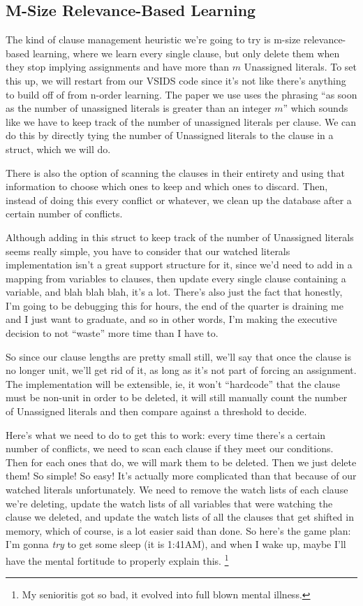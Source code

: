 \documentclass[oneside]{book}
\begin{document}
\subsection{M-Size Relevance-Based Learning}

The kind of clause management heuristic we're going to try is m-size relevance-based 
learning, where we learn every single clause, but only delete them when they stop 
implying assignments and have more than $m$ Unassigned literals. To set this up, 
we will restart from our VSIDS code since it's not like there's anything to build off of 
from n-order learning. The paper we use uses the phrasing ``as soon as the number of
unassigned literals is greater than an integer $m$'' which sounds like we have to keep 
track of the number of unassigned literals per clause. We can do this by directly tying 
the number of Unassigned literals to the clause in a struct, which we will do. 

There is also the option of scanning the clauses in their entirety and using that information 
to choose which ones to keep and which ones to discard. Then, instead of doing this every 
conflict or whatever, we clean up the database after a certain number of conflicts.

Although adding in this struct to keep track of the number of Unassigned literals seems 
really simple, you have to consider that our watched literals implementation isn't a great 
support structure for it, since we'd need to add in a mapping from variables to clauses,
then update every single clause containing a variable, and blah blah blah, it's a lot.
There's also just the fact that honestly, I'm going to be debugging this for hours, the 
end of the quarter is draining me and I just want to graduate, and so in other words,
I'm making the executive decision to not ``waste'' more time than I have to.

So since our clause lengths are pretty small still, we'll say that once the clause 
is no longer unit, we'll get rid of it, as long as it's not part of forcing an assignment.
The implementation will be extensible, ie, it won't ``hardcode'' that the clause must be 
non-unit in order to be deleted, it will still manually count the number of Unassigned 
literals and then compare against a threshold to decide.

Here's what we need to do to get this to work: every time there's a certain number 
of conflicts, we need to scan each clause if they meet our conditions. Then for 
each ones that do, we will mark them to be deleted. Then we just delete them! So simple!
So easy! It's actually more complicated than that because of our watched literals unfortunately.
We need to remove the watch lists of each clause we're deleting, update the watch lists of all 
variables that were watching the clause we deleted, and update the watch lists of all the clauses 
that get shifted in memory, which of course, is a lot easier said than done. So here's the game 
plan: I'm gonna \textit{try} to get some sleep (it is 1:41AM), and when I wake up, maybe I'll 
have the mental fortitude to properly explain this.
\footnote{My senioritis got so bad, it evolved into full blown mental illness.}
\end{document}

